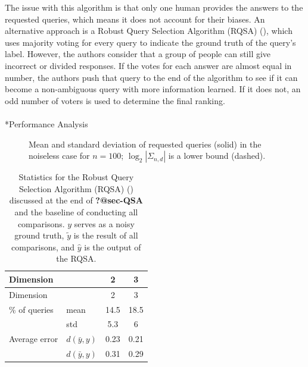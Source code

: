 \documentclass[
  letterpaper,
  numbers=noenddot,
  DIV=11]{scrreprt}
\makeatletter
\let\oldparagraph\paragraph
\renewcommand{\paragraph}{
    \@ifstar
      \xxxParagraphStar
      \xxxParagraphNoStar
  }
\newcommand{\xxxParagraphStar}[1]{\oldparagraph*{#1}\mbox{}}
\newcommand{\xxxParagraphNoStar}[1]{\oldparagraph{#1}\mbox{}}
\theoremstyle{definition}
\theoremstyle{plain}
\theoremstyle{plain}
\theoremstyle{remark}
\makeatother
\begin{document}
The issue with this algorithm is that only one human provides the
answers to the requested queries, which means it does not account for
their biases. An alternative approach is a Robust Query Selection
Algorithm (RQSA) (), which
uses majority voting for every query to indicate the ground truth of the
query's label. However, the authors consider that a group of people can
still give incorrect or divided responses. If the votes for each answer
are almost equal in number, the authors push that query to the end of
the algorithm to see if it can become a non-ambiguous query with more
information learned. If it does not, an odd number of voters is used to
determine the final ranking.

\paragraph*{Performance Analysis}\label{sec-QSA}

\begin{figure}


\caption{\label{fig-rand_n}Mean and standard deviation of requested
queries (solid) in the noiseless case for \(n = 100\);
\(\log_2|\Sigma_{n,d}|\) is a lower bound (dashed).}

\end{figure}%

\begin{longtable}[]{@{}llcc@{}}
\caption{Statistics for the Robust Query Selection Algorithm (RQSA)
() discussed at the end of
\textbf{?@sec-QSA} and the baseline of conducting all comparisons. \(y\)
serves as a noisy ground truth, \(\tilde{y}\) is the result of all
comparisons, and \(\hat{y}\) is the output of the
RQSA.}\label{tbl-geo_acc}\tabularnewline
\toprule\noalign{}
Dimension & & 2 & 3 \\
\midrule\noalign{}
\endfirsthead
\toprule\noalign{}
Dimension & & 2 & 3 \\
\midrule\noalign{}
\endhead
\bottomrule\noalign{}
\endlastfoot
\% of queries & mean & 14.5 & 18.5 \\
& std & 5.3 & 6 \\
Average error & \(d(\bar{y}, y)\) & 0.23 & 0.21 \\
& \(d(\bar{y}, y)\) & 0.31 & 0.29 \\
\end{longtable}
\end{document}
